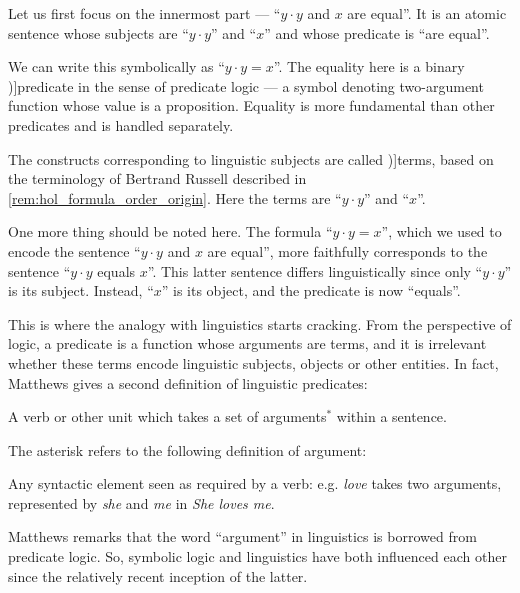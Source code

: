 \begin{concept}
\begin{thmenum}
    Let us first focus on the innermost part --- \enquote{\( y \cdot y \) and \( x \) are equal}. It is an atomic sentence whose subjects are \enquote{\( y \cdot y \)} and \enquote{\( x \)} and whose predicate is \enquote{are equal}.

    We can write this symbolically as \enquote{\( y \cdot y = x \)}. The equality here is a binary \term[en=predicate (\cite[74]{Kleene2002Logic})]{predicate} in the sense of predicate logic --- a symbol denoting two-argument function whose value is a proposition. Equality is more fundamental than other predicates and is handled separately.

    The constructs corresponding to linguistic subjects are called \term[en=terms (\cite[237]{Russell1908TypeTheory})]{terms}, based on the terminology of Bertrand Russell described in \cref{rem:hol_formula_order_origin}. Here the terms are \enquote{\( y \cdot y \)} and \enquote{\( x \)}.

    One more thing should be noted here. The formula \enquote{\( y \cdot y = x \)}, which we used to encode the sentence \enquote{\( y \cdot y \) and \( x \) are equal}, more faithfully corresponds to the sentence \enquote{\( y \cdot y \) equals \( x \)}. This latter sentence differs linguistically since only \enquote{\( y \cdot y \)} is its subject. Instead, \enquote{\( x \)} is its object, and the predicate is now \enquote{equals}.

    This is where the analogy with linguistics starts cracking. From the perspective of logic, a predicate is a function whose arguments are terms, and it is irrelevant whether these terms encode linguistic subjects, objects or other entities. In fact, Matthews gives a second definition of linguistic predicates:
    \begin{displayquote}
      A verb or other unit which takes a set of arguments\( {}^* \) within a sentence.
    \end{displayquote}

    The asterisk refers to the following definition of argument:
    \begin{displayquote}
      Any syntactic element seen as required by a verb: e.g. \textit{love} takes two arguments, represented by \textit{she} and \textit{me} in \textit{She loves me}.
    \end{displayquote}

    Matthews remarks that the word \enquote{argument} in linguistics is borrowed from predicate logic. So, symbolic logic and linguistics have both influenced each other since the relatively recent inception of the latter.


\end{thmenum}
\end{concept}
